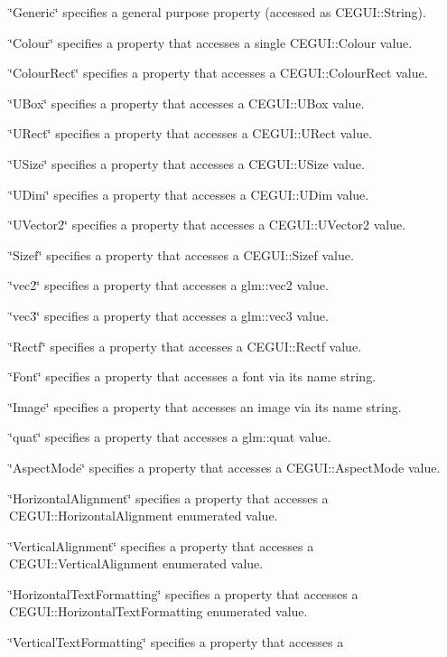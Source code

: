 \begin{DoxyItemize}
\item {\ttfamily \char`\"{}\+Generic\char`\"{}} specifies a general purpose property (accessed as C\+E\+G\+U\+I\+::\+String). \item {\ttfamily \char`\"{}\+Colour\char`\"{}} specifies a property that accesses a single C\+E\+G\+U\+I\+::\+Colour value. \item {\ttfamily \char`\"{}\+Colour\+Rect\char`\"{}} specifies a property that accesses a C\+E\+G\+U\+I\+::\+Colour\+Rect value. \item {\ttfamily \char`\"{}\+U\+Box\char`\"{}} specifies a property that accesses a C\+E\+G\+U\+I\+::\+U\+Box value. \item {\ttfamily \char`\"{}\+U\+Rect\char`\"{}} specifies a property that accesses a C\+E\+G\+U\+I\+::\+U\+Rect value. \item {\ttfamily \char`\"{}\+U\+Size\char`\"{}} specifies a property that accesses a C\+E\+G\+U\+I\+::\+U\+Size value. \item {\ttfamily \char`\"{}\+U\+Dim\char`\"{}} specifies a property that accesses a C\+E\+G\+U\+I\+::\+U\+Dim value. \item {\ttfamily \char`\"{}\+U\+Vector2\char`\"{}} specifies a property that accesses a C\+E\+G\+U\+I\+::\+U\+Vector2 value. \item {\ttfamily \char`\"{}\+Sizef\char`\"{}} specifies a property that accesses a C\+E\+G\+U\+I\+::\+Sizef value. \item {\ttfamily \char`\"{}vec2\char`\"{}} specifies a property that accesses a glm\+::vec2 value. \item {\ttfamily \char`\"{}vec3\char`\"{}} specifies a property that accesses a glm\+::vec3 value. \item {\ttfamily \char`\"{}\+Rectf\char`\"{}} specifies a property that accesses a C\+E\+G\+U\+I\+::\+Rectf value. \item {\ttfamily \char`\"{}\+Font\char`\"{}} specifies a property that accesses a font via its name string. \item {\ttfamily \char`\"{}\+Image\char`\"{}} specifies a property that accesses an image via its name string. \item {\ttfamily \char`\"{}quat\char`\"{}} specifies a property that accesses a glm\+::quat value. \item {\ttfamily \char`\"{}\+Aspect\+Mode\char`\"{}} specifies a property that accesses a C\+E\+G\+U\+I\+::\+Aspect\+Mode value. \item {\ttfamily \char`\"{}\+Horizontal\+Alignment\char`\"{}} specifies a property that accesses a C\+E\+G\+U\+I\+::\+Horizontal\+Alignment enumerated value. \item {\ttfamily \char`\"{}\+Vertical\+Alignment\char`\"{}} specifies a property that accesses a C\+E\+G\+U\+I\+::\+Vertical\+Alignment enumerated value. \item {\ttfamily \char`\"{}\+Horizontal\+Text\+Formatting\char`\"{}} specifies a property that accesses a C\+E\+G\+U\+I\+::\+Horizontal\+Text\+Formatting enumerated value. \item {\ttfamily \char`\"{}\+Vertical\+Text\+Formatting\char`\"{}} specifies a property that accesses a 
\end{DoxyItemize}
